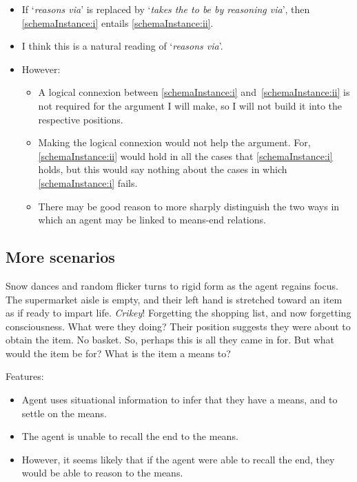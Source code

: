 \documentclass[10pt]{article}
\begin{document}
\begin{itemize}
\item If `\emph{reasons via}' is replaced by `\emph{takes the to be by reasoning via}', then \ref{schemaInstance:i} entails \ref{schemaInstance:ii}.
\item I think this is a natural reading of `\emph{reasons via}'.
\item However:
  \begin{itemize}
  \item A logical connexion between \ref{schemaInstance:i} and~\ref{schemaInstance:ii} is not required for the argument I will make, so I will not build it into the respective positions.
  \item Making the logical connexion would not help the argument. For, \ref{schemaInstance:ii} would hold in all the cases that \ref{schemaInstance:i} holds, but this would say nothing about the cases in which \ref{schemaInstance:i} fails.
  \item There may be good reason to more sharply distinguish the two ways in which an agent may be linked to means-end relations.
  \end{itemize}
\end{itemize}

\subsection{More scenarios}
\label{sec:more-scenarios}



\begin{scenario}[Supermarket]
  Snow dances and random flicker turns to rigid form as the agent regains focus.
  The supermarket aisle is empty, and their left hand is stretched toward an item as if ready to impart life.
  \emph{Crikey}!
  Forgetting the shopping list, and now forgetting consciousness.
  What were they doing?
  Their position suggests they were about to obtain the item.
  No basket. So, perhaps this is all they came in for.
  But what would the item be for? What is the item a means to?
\end{scenario}

Features:
\begin{itemize}
\item Agent uses situational information to infer that they have a means, and to settle on the means.
\item The agent is unable to recall the end to the means.
\item However, it seems likely that if the agent were able to recall the end, they would be able to reason to the means.
\end{itemize}
\end{document}
